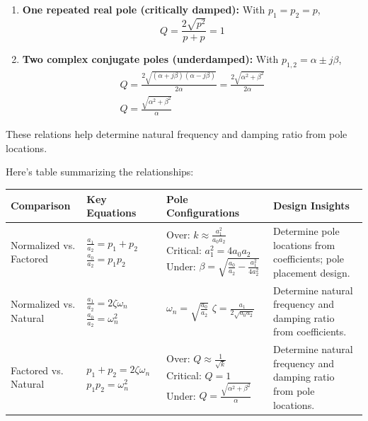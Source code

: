 \begin{enumerate}
\begin{enumerate}
        For large k:
        \[ \boxed{Q \approx \frac{1}{\sqrt{k}}} \]
      \item \textbf{One repeated real pole (critically damped):} With \( p_1 = p_2 = p \),
        \[ Q = \frac{2\sqrt{p^2}}{p + p} = \boxed{1} \]
      \item \textbf{Two complex conjugate poles (underdamped):} With \( p_{1,2} = \alpha \pm j\beta \),
        \begin{align*}
           Q = \frac{2\sqrt{(\alpha + j\beta)(\alpha - j\beta)}}{2\alpha}
           = \frac{2\sqrt{\alpha^2 + \beta^2}}{2\alpha} \\
           \boxed{ Q = \frac{\sqrt{\alpha^2 + \beta^2}}{\alpha}}
         \end{align*}
    \end{enumerate}
    These relations help determine natural frequency and
    damping ratio from pole locations.
\end{enumerate}
Here's  table summarizing the relationships:
\begin{center}
  \begin{tabularx}{\linewidth}{|X|X|X|X|} \hline
    \textbf{Comparison} & \textbf{Key Equations} & \textbf{Pole Configurations} & \textbf{Design Insights} \\ \hline
    Normalized vs. Factored & \(\frac{a_1}{a_2} = p_1 + p_2\) \newline \(\frac{a_0}{a_2} = p_1 p_2\) & Over: \(k \approx \frac{a_1^2}{a_0 a_2}\) \newline Critical: \(a_1^2 = 4 a_0 a_2\) \newline Under: \(\beta = \sqrt{\frac{a_0}{a_2} - \frac{a_1^2}{4a_2^2}}\) & Determine pole locations from coefficients; pole placement design. \\ \hline
    Normalized vs. Natural & \(\frac{a_1}{a_2} = 2\zeta\omega_n\) \newline \(\frac{a_0}{a_2} = \omega_n^2\) & \(\omega_n = \sqrt{\frac{a_0}{a_2}}\) \newline \(\zeta = \frac{a_1}{2\sqrt{a_0 a_2}}\) & Determine natural frequency and damping ratio from coefficients. \\ \hline
    Factored vs. Natural & \(p_1 + p_2 = 2\zeta\omega_n\) \newline \(p_1 p_2 = \omega_n^2\) & Over: \(Q \approx \frac{1}{\sqrt{k}}\) \newline Critical: \(Q = 1\) \newline Under: \(Q = \frac{\sqrt{\alpha^2 + \beta^2}}{\alpha}\) & Determine natural frequency and damping ratio from pole locations. \\ \hline
  \end{tabularx}
\end{center}

